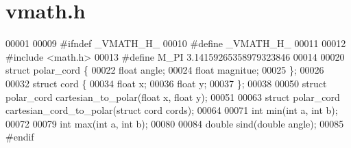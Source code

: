 \section{vmath.\+h}
\label{vmath_8h_source}

\begin{DoxyCode}
00001 
00009 \textcolor{preprocessor}{#ifndef \_VMATH\_H\_}
00010 \textcolor{preprocessor}{#define \_VMATH\_H\_}
00011 
00012 \textcolor{preprocessor}{#include <math.h>}
00013 \textcolor{preprocessor}{#define M\_PI 3.14159265358979323846}
00014 
00020 \textcolor{keyword}{struct }polar_cord \{
00022   \textcolor{keywordtype}{float} angle;
00024   \textcolor{keywordtype}{float} magnitue;
00025 \};
00026 
00032 \textcolor{keyword}{struct }cord \{
00034   \textcolor{keywordtype}{float} x;
00036   \textcolor{keywordtype}{float} y;
00037 \};
00038 
00050 \textcolor{keyword}{struct }polar_cord cartesian_to_polar(float x, float y);
00051 
00063 \textcolor{keyword}{struct }polar_cord cartesian_cord_to_polar(struct cord cords);
00064 
00071 \textcolor{keywordtype}{int} min(\textcolor{keywordtype}{int} a, \textcolor{keywordtype}{int} b);
00072 
00079 \textcolor{keywordtype}{int} max(\textcolor{keywordtype}{int} a, \textcolor{keywordtype}{int} b);
00080 
00084 \textcolor{keywordtype}{double} sind(\textcolor{keywordtype}{double} angle);
00085 \textcolor{preprocessor}{#endif}
\end{DoxyCode}
